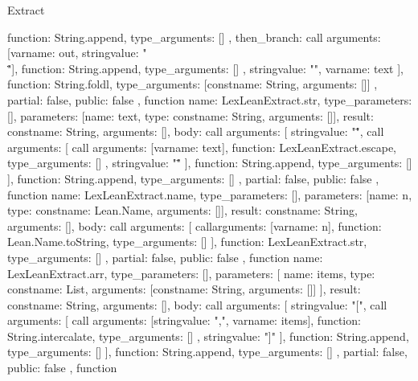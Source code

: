 \begin{lexlean}{Extract}
\begin{toolingmodule}
{{{{{{{                  function: String.append,
                  type_arguments: []
                }
              },
              then_branch: call{
                arguments: [var{name: out}, string{value: "\\\""}],
                function: String.append,
                type_arguments: []
              }
            }
          },
          string{value: ""},
          var{name: text}
        ],
        function: String.foldl,
        type_arguments: [const{name: String, arguments: []}]
      },
      partial: false,
      public: false
    },
    function{
      name: LexLeanExtract.str,
      type_parameters: [],
      parameters: [{name: text, type: const{name: String, arguments: []}}],
      result: const{name: String, arguments: []},
      body: call{
        arguments: [
          string{value: "\""},
          call{
            arguments: [
              call{
                arguments: [var{name: text}],
                function: LexLeanExtract.escape,
                type_arguments: []
              },
              string{value: "\""}
            ],
            function: String.append,
            type_arguments: []
          }
        ],
        function: String.append,
        type_arguments: []
      },
      partial: false,
      public: false
    },
    function{
      name: LexLeanExtract.name,
      type_parameters: [],
      parameters: [{name: n, type: const{name: Lean.Name, arguments: []}}],
      result: const{name: String, arguments: []},
      body: call{
        arguments: [
          call{arguments: [var{name: n}], function: Lean.Name.toString, type_arguments: []}
        ],
        function: LexLeanExtract.str,
        type_arguments: []
      },
      partial: false,
      public: false
    },
    function{
      name: LexLeanExtract.arr,
      type_parameters: [],
      parameters: [
        {name: items, type: const{name: List, arguments: [const{name: String, arguments: []}]}}
      ],
      result: const{name: String, arguments: []},
      body: call{
        arguments: [
          string{value: "["},
          call{
            arguments: [
              call{
                arguments: [string{value: ","}, var{name: items}],
                function: String.intercalate,
                type_arguments: []
              },
              string{value: "]"}
            ],
            function: String.append,
            type_arguments: []
          }
        ],
        function: String.append,
        type_arguments: []
      },
      partial: false,
      public: false
    },
    function{
}}
\end{toolingmodule}
\end{lexlean}
